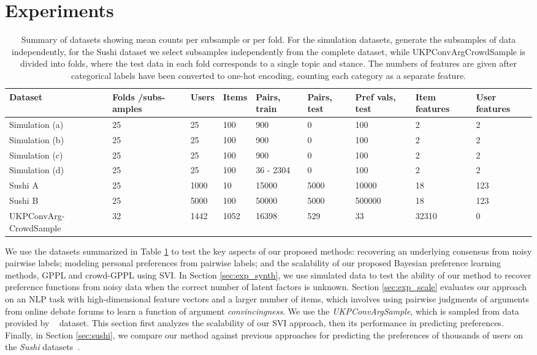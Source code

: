 \section{Experiments}\label{sec:expts}

\begin{table}
\begin{tabularx}{\textwidth}{| p{1.9cm} | X | X | X | X | X | X | X | X |}
\hline
Dataset & Folds /subs-amples & Users & Items & Pairs, train & Pairs, test & Pref vals, test & Item features & User features \\
\hline\hline
Simulation (a) & 25 & 25 & 100 & 900 & 0  & 100 & 2 & 2\\
Simulation (b) & 25 & 25 & 100 & 900 & 0 & 100 & 2 & 2 \\
Simulation (c) & 25 & 25 & 100 & 900 & 0 & 100 & 2 & 2\\
Simulation (d) & 25 & 25 & 100 & 36 - 2304 & 0 & 100 & 2 & 2\\
\hline
Sushi A & 25 & 1000 & 10 & 15000 & 5000 & 10000 & 18 & 123 \\
Sushi B & 25 & 5000 & 100 & 50000 & 5000 & 500000 &  18 & 123 \\
\hline
UKPConvArg-CrowdSample & 32 & 1442 & 1052 & 16398 & 529 & 33 & 32310 & 0
\\ \hline
\end{tabularx}
\caption{Summary of datasets showing mean counts per subsample or per fold. For the simulation datasets, generate the subsamples of data independently, for the Sushi dataset we select subsamples independently from the complete dataset, while  
UKPConvArgCrowdSample is divided into folds, where the test data in each fold corresponds to a single topic and stance. The numbers of features are given after categorical labels have been converted to one-hot encoding, counting
each category as a separate feature.
}
\label{tab:datasets}
\end{table}
We use the datasets summarized in Table \ref{tab:datasets} to test the key aspects of our proposed methods: recovering an underlying consensus from noisy pairwise labels; modeling personal preferences from pairwise labels; and the scalability of our proposed Bayesian preference learning methods, GPPL and crowd-GPPL using SVI.
In Section \ref{sec:exp_synth}, we use simulated data to test the ability of our method to recover preference functions from noisy data when the correct number of latent factors is unknown. 
Section \ref{sec:exp_scale} evaluates our approach on an NLP task with high-dimensional feature vectors and
a larger number of items, which involves using pairwise judgments of arguments from online debate forums 
to learn a function of argument \emph{convincingness}. We use the \emph{UKPConvArgSample},
which is
sampled from data provided by ~\citet{habernal2016argument} dataset.
This section first analyzes the scalability of our SVI approach, then its performance in 
predicting preferences. 
Finally, in Section \ref{sec:sushi}, we compare our method against previous approaches for predicting the preferences
of thousands of users on the \emph{Sushi} datasets~\citep{kamishima2003nantonac}.

